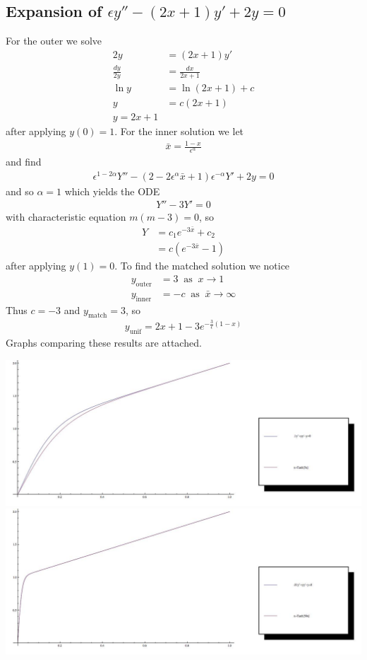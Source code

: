 \documentclass[12pt]{article}
\newcommand{\eq}[1]{\begin{align*}#1\end{align*}}
\newcommand{\on}[1]{\operatorname{#1}}
\begin{document}
\subsection*{Expansion of $\epsilon y'' - (2x+1)y' + 2y = 0$}
For the outer we solve
\eq{
	2y &= (2x+1)y'\\
	\frac{dy}{2y} &= \frac{dx}{2x+1}\\
	\ln y &= \ln (2x + 1) + c\\
	y &= c(2x + 1)\\
	y = 2x + 1
}
after applying $y(0) = 1$. For the inner solution we let
\eq{
	\bar{x} = \frac{1 - x}{\epsilon^\alpha}
}
and find
\eq{
	\epsilon^{1-2\alpha}Y'' - (2 - 2\epsilon^\alpha\bar{x} + 1)\epsilon^{-\alpha}Y' + 2y = 0
}
and so $\alpha = 1$ which yields the ODE
\eq{
	Y'' - 3Y' = 0
}
with characteristic equation $m(m-3) = 0$, so
\eq{
	Y &= c_1 e^{-3\bar{x}} + c_2\\
	&= c(e^{-3\bar{x}} - 1)
}
after applying $y(1) = 0$. To find the matched solution we notice
\eq{
	y_{\on{outer}} &= 3\;\on{as}\;x \rightarrow 1\\
	y_{\on{inner}} &= -c\;\on{as}\;\bar{x} \rightarrow \infty
}
Thus $c = -3$ and $y_{\on{match}} = 3$, so
\eq{
	y_{\on{unif}} = 2x + 1 - 3e^{-\frac{3}{\epsilon}(1-x)}
}
Graphs comparing these results are attached.
\begin{table}[l]
	\includegraphics[width=6in]{graph1.jpg}\\
	\includegraphics[width=6in]{graph2.jpg}
\end{table}
\end{document}
